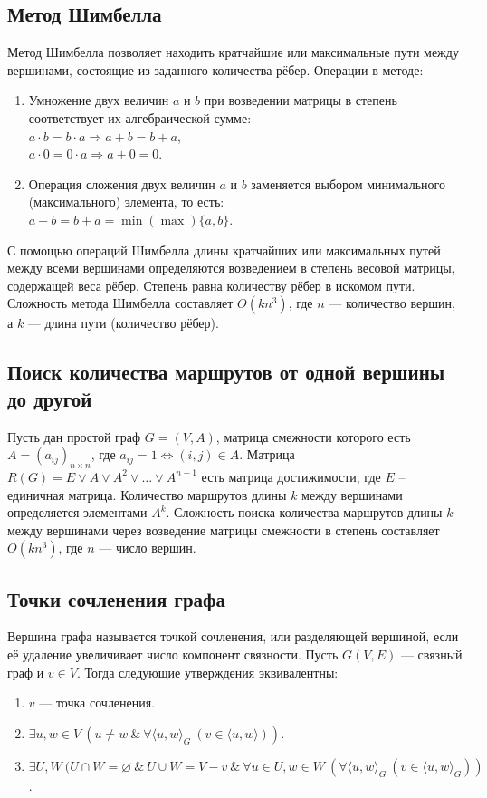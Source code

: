 \subsection{Метод Шимбелла}
Метод Шимбелла позволяет находить кратчайшие или максимальные пути между вершинами, состоящие из заданного количества рёбер. Операции в методе:
\begin{enumerate}
	\item Умножение двух величин $a$ и $b$ при возведении матрицы в степень соответствует их алгебраической сумме: \\ $a \cdot b = b \cdot a \Rightarrow a + b = b + a$, \\ $a \cdot 0 = 0 \cdot a \Rightarrow a + 0 = 0$.
	\item Операция сложения двух величин $a$ и $b$ заменяется выбором минимального (максимального) элемента, то есть: \\ $a + b = b + a = \min(\max)\{a, b\}$.
\end{enumerate}
С помощью операций Шимбелла длины кратчайших или максимальных путей между всеми вершинами определяются возведением в степень весовой матрицы, содержащей веса рёбер. Степень равна количеству рёбер в искомом пути. Сложность метода Шимбелла составляет $O(kn^3)$, где $n$ — количество вершин, а $k$ — длина пути (количество рёбер).

\subsection{Поиск количества маршрутов от одной вершины до другой}
Пусть дан простой граф $G = (V, A)$, матрица смежности которого есть $A = (a_{ij})_{n\times n}$, где $a_{ij}=1 \Leftrightarrow (i,j) \in A$. Матрица $R(G) = E \lor A \lor A^2 \lor \dots \lor A^{n-1}$ есть матрица достижимости, где $E$ – единичная матрица. Количество маршрутов длины $k$ между вершинами определяется элементами $A^k$. Сложность поиска количества маршрутов длины $k$ между вершинами через возведение матрицы смежности в степень составляет $O(kn^3)$, где $n$ — число вершин.


\subsection{Точки сочленения графа}
Вершина графа называется точкой сочленения, или разделяющей вершиной, если её удаление увеличивает число компонент связности. Пусть \( G(V, E) \) — связный граф и \( v \in V \). Тогда следующие утверждения эквивалентны:
\begin{enumerate}
	\item \( v \) — точка сочленения.
	\item \( \exists u, w \in V \ (u \neq w \ \& \ \forall \langle u, w \rangle_G \ (v \in \langle u, w \rangle)) \).
	\item \( \exists U, W \ (U \cap W = \varnothing \ \& \ U \cup W = V - v \ \& \ \forall u \in U, w \in W \ (\forall \langle u, w \rangle_G \ (v \in \langle u, w \rangle_G)) \).
\end{enumerate}

